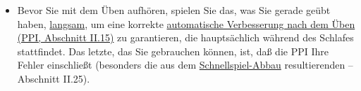 \begin{itemize}
\item Bevor Sie mit dem Üben aufhören, spielen Sie das, was Sie gerade geübt haben, \hyperref[c1ii17]{langsam}, um eine korrekte \hyperref[c1ii15]{automatische Verbesserung nach dem Üben (PPI, Abschnitt II.15)} zu garantieren, die hauptsächlich während des Schlafes stattfindet.
Das letzte, das Sie gebrauchen können, ist, daß die PPI Ihre Fehler einschließt (besonders die aus dem \hyperref[fpd]{Schnellspiel-Abbau} resultierenden -- Abschnitt II.25).
\end{itemize}




